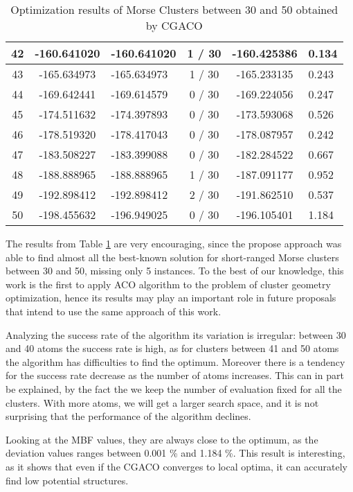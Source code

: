 \begin{table}[!htbp]
\begin{center}
\begin{tabular}{| c | c | p{3cm} | c | c | p{2cm} |}
				42 & -160.641020 & -160.641020 & 1 / 30 & -160.425386 & 0.134 \\ \hline
				43 & -165.634973 & -165.634973 & 1 / 30 & -165.233135 & 0.243 \\ \hline
				44 & -169.642441 & -169.614579 & 0 / 30 & -169.224056 & 0.247 \\ \hline
				45 & -174.511632 & -174.397893 & 0 / 30 & -173.593068 & 0.526 \\ \hline
				46 & -178.519320 & -178.417043 & 0 / 30 & -178.087957 & 0.242 \\ \hline
				47 & -183.508227 & -183.399088 & 0 / 30 & -182.284522 & 0.667 \\ \hline
				48 & -188.888965 & -188.888965 & 1 / 30 & -187.091177 & 0.952 \\ \hline
				49 & -192.898412 & -192.898412 & 2 / 30 & -191.862510 & 0.537 \\ \hline
				50 & -198.455632 & -196.949025 & 0 / 30 & -196.105401 & 1.184 \\ \hline
			\end{tabular}
		\caption{Optimization results of Morse Clusters between 30 and 50 obtained by CGACO}
		\label{tab:optimization_results}
		\end{center}
	\end{table}
	
	The results from Table \ref{tab:optimization_results} are very encouraging, since the propose approach was able to find almost all the best-known solution for short-ranged Morse clusters between 30 and 50, missing only 5 instances.
	To the best of our knowledge, this work is the first to apply ACO algorithm to the problem of cluster geometry optimization, hence its results may play an important role in future proposals that intend to use the same approach of this work.
	
	Analyzing the success rate of the algorithm its variation is irregular: between 30 and 40 atoms the success rate is high, as for clusters between 41 and 50 atoms the algorithm has difficulties to find the optimum. Moreover there is a tendency for the success rate decrease as the number of atoms increases. This can in part be explained, by the fact the we keep the number of evaluation fixed for all the clusters. With more atoms, we will get a larger search space, and it is not surprising that the performance of the algorithm declines.
	
	Looking at the MBF values, they are always close to the optimum, as the deviation values ranges between 0.001 \% and 1.184 \%. This result is interesting, as it shows that even if the CGACO converges to local optima, it can accurately find low potential structures.
	
